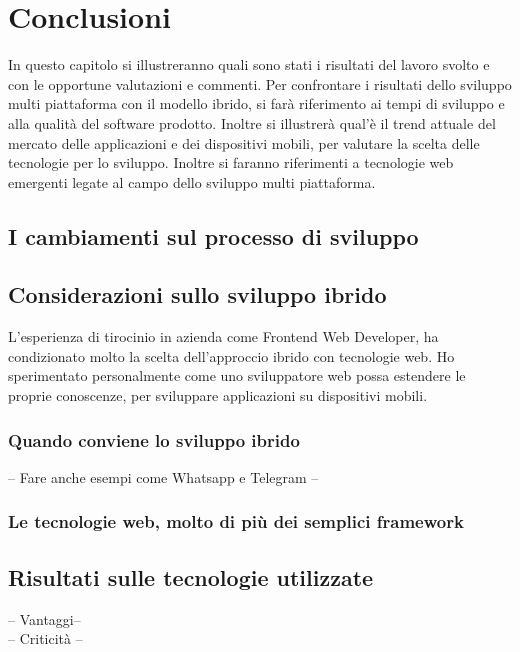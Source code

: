 \chapter{Conclusioni}

In questo capitolo si illustreranno quali sono stati i risultati del lavoro svolto e con le opportune valutazioni e commenti. Per confrontare i risultati dello sviluppo multi piattaforma con il modello ibrido, si farà riferimento ai tempi di sviluppo e alla qualità del software prodotto. Inoltre si illustrerà qual'è il trend attuale del mercato delle applicazioni e dei dispositivi mobili, per valutare la scelta delle tecnologie per lo sviluppo. Inoltre si faranno riferimenti a tecnologie web emergenti legate al campo dello sviluppo multi piattaforma.

\section{I cambiamenti sul processo di sviluppo}

\section{Considerazioni sullo sviluppo ibrido}
L'esperienza di tirocinio in azienda come Frontend Web Developer, ha condizionato molto la scelta dell'approccio ibrido con tecnologie web. Ho sperimentato personalmente come uno sviluppatore web possa estendere le proprie conoscenze, per sviluppare applicazioni su dispositivi mobili.

\subsection{Quando conviene lo sviluppo ibrido}

-- Fare anche esempi come Whatsapp e Telegram --\\

\subsection{Le tecnologie web, molto di più dei semplici framework}

\section{Risultati sulle tecnologie utilizzate}

-- Vantaggi-- \\
-- Criticità --\\



